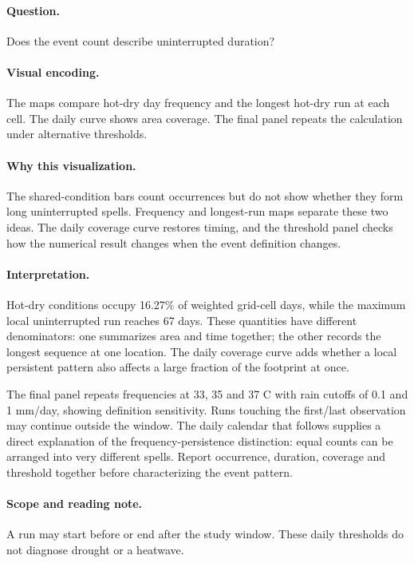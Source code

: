 \documentclass[conference,a4paper]{IEEEtran}
\begin{document}
\paragraph{Question.} Does the event count describe uninterrupted duration?



\paragraph{Visual encoding.} The maps compare hot-dry day frequency and the longest hot-dry run at each cell. The daily curve shows area coverage. The final panel repeats the calculation under alternative thresholds.



\paragraph{Why this visualization.} The shared-condition bars count occurrences but do not show whether they form long uninterrupted spells. Frequency and longest-run maps separate these two ideas. The daily coverage curve restores timing, and the threshold panel checks how the numerical result changes when the event definition changes.



\paragraph{Interpretation.} Hot-dry conditions occupy 16.27\% of weighted grid-cell days, while the maximum local uninterrupted run reaches 67 days. These quantities have different denominators: one summarizes area and time together; the other records the longest sequence at one location. The daily coverage curve adds whether a local persistent pattern also affects a large fraction of the footprint at once.

The final panel repeats frequencies at 33, 35 and 37 C with rain cutoffs of 0.1 and 1 mm/day, showing definition sensitivity. Runs touching the first/last observation may continue outside the window. The daily calendar that follows supplies a direct explanation of the frequency-persistence distinction: equal counts can be arranged into very different spells. Report occurrence, duration, coverage and threshold together before characterizing the event pattern.



\paragraph{Scope and reading note.} A run may start before or end after the study window. These daily thresholds do not diagnose drought or a heatwave.
\end{document}
